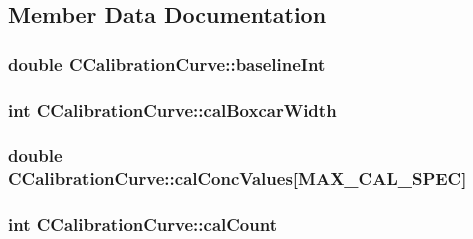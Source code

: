 \subsection{Member Data Documentation}
\hypertarget{classCCalibrationCurve_a2deaf658bd351d099ae5b07faea5fd66}{
\subsubsection[{baselineInt}]{\setlength{\rightskip}{0pt plus 5cm}double {\bf CCalibrationCurve::baselineInt}}}
\label{classCCalibrationCurve_a2deaf658bd351d099ae5b07faea5fd66}
\hypertarget{classCCalibrationCurve_ab1ef11c45a983e95342e31f51191a512}{
\subsubsection[{calBoxcarWidth}]{\setlength{\rightskip}{0pt plus 5cm}int {\bf CCalibrationCurve::calBoxcarWidth}}}
\label{classCCalibrationCurve_ab1ef11c45a983e95342e31f51191a512}
\hypertarget{classCCalibrationCurve_a1034401a36caabbad0f2ab2ffef2aff5}{
\subsubsection[{calConcValues}]{\setlength{\rightskip}{0pt plus 5cm}double {\bf CCalibrationCurve::calConcValues}\mbox{[}MAX\_\-CAL\_\-SPEC\mbox{]}}}
\label{classCCalibrationCurve_a1034401a36caabbad0f2ab2ffef2aff5}
\hypertarget{classCCalibrationCurve_a30ff71dcb7acaca69bc0a169e77681f1}{
\subsubsection[{calCount}]{\setlength{\rightskip}{0pt plus 5cm}int {\bf CCalibrationCurve::calCount}}}
